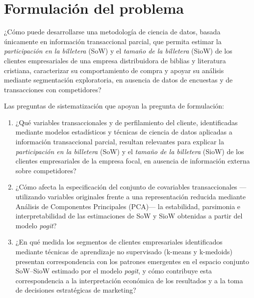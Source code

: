 
\section{Formulación del problema}
¿Cómo puede desarrollarse una metodología de ciencia de datos, basada únicamente en información transaccional parcial, que permita estimar la \emph{participación en la billetera} (SoW) y el \emph{tamaño de la billetera} (SioW) de los clientes empresariales de una empresa distribuidora de biblias y literatura cristiana, caracterizar su comportamiento de compra y apoyar su análisis mediante segmentación exploratoria, en ausencia de datos de encuestas y de transacciones con competidores?

Las preguntas de sistematización que apoyan la pregunta de formulación:

\begin{enumerate}
    \item ¿Qué variables transaccionales y de perfilamiento del cliente, identificadas mediante modelos estadísticos y técnicas de ciencia de datos aplicadas a información transaccional parcial, resultan relevantes para explicar la \emph{participación en la billetera} (SoW) y el \emph{tamaño de la billetera} (SioW) de los clientes empresariales de la empresa focal, en ausencia de información externa sobre competidores?

    \item ¿Cómo afecta la especificación del conjunto de covariables transaccionales —utilizando variables originales frente a una representación reducida mediante Análisis de Componentes Principales (PCA)— la estabilidad, parsimonia e interpretabilidad de las estimaciones de SoW y SioW obtenidas a partir del modelo \emph{pogit}?

    \item ¿En qué medida los segmentos de clientes empresariales identificados mediante técnicas de aprendizaje no supervisado (k-means y k-medoids) presentan correspondencia con los patrones emergentes en el espacio conjunto SoW--SioW estimado por el modelo \emph{pogit}, y cómo contribuye esta correspondencia a la interpretación económica de los resultados y a la toma de decisiones estratégicas de marketing?
\end{enumerate}
